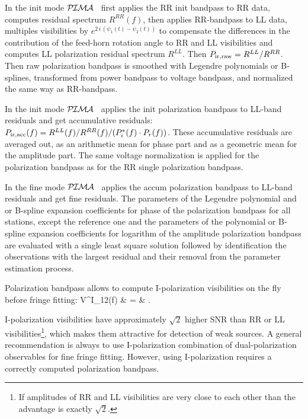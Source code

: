 \documentclass[11pt]{article}
\newcommand{\PIMA}{\textcolor{Dgreen}{$\cal P\hspace{-0.067em}I\hspace{-0.067em}M\hspace{-0.067em}A$} }
\begin{document}
  In the {\sc init} mode \PIMA\ first applies the RR {\sc init} bandpass 
to RR data, computes residual spectrum $R^{RR}(f)$, then applies RR-bandpass 
to LL data, multiples visibilities by $e^{2 \, i \, (\psi_1(t) - \psi_2(t))}$
to compensate the differences in the contribution of the feed-horn rotation
angle to RR and LL visibilities and computes LL polarization residual spectrum
$R^{LL}$. Then $P_{\rm ir,raw} = R^{LL}/R^{RR}$. Then raw polarization bandpass
is smoothed with Legendre polynomials or B-splines, transformed from power
bandpass to voltage bandpass, and normalized the same way as RR-bandpass.

  In the {\sc init} mode \PIMA\ applies the {\sc init} polarization bandpass to 
LL-band residuals and get accumulative residuals:
$P_{\rm ir,acc}(f) = R^{LL}(f)/R^{RR}(f)/(P_i^{*}(f) \cdot P_r(f))$.
These accumulative residuals are averaged out, as an arithmetic mean for 
phase part and as a geometric mean for the amplitude part. The same voltage
normalization is applied for the polarization bandpass as for the RR single
polarization bandpass.
  
  In the {\sc fine} mode \PIMA\ applies the {\sc accum} polarization bandpass 
to LL-band residuals and get fine residuals. The parameters of the Legendre
polynomial and or B-spline expansion coefficients for phase of the polarization 
bandpass for all stations, except the reference one and the parameters of 
the polynomial or B-spline expansion coefficients for logarithm of the 
amplitude polarization bandpass are evaluated with a single least square
solution followed by identification the observations with the largest residual
and their removal from the parameter estimation process.

  Polarization bandpass allows to compute I-polarization visibilities on 
the fly before fringe fitting:
%
\beq
     V^{I}_{\rm 12}(f) & = & 
               { \cdot 
               }.

  I-polarization visibilities have approximately $\sqrt{2}$ higher SNR than
RR or LL visibilities\footnote{If amplitudes  of RR and LL visibilities 
are very close to each other than the advantage is exactly $\sqrt{2}$.},
which makes them attractive for detection of weak sources. A general 
recommendation is always to use I-polarization combination of dual-polarization
observables for fine fringe fitting. However, using I-polarization requires
a correctly computed polarization bandpass.
\end{document}
